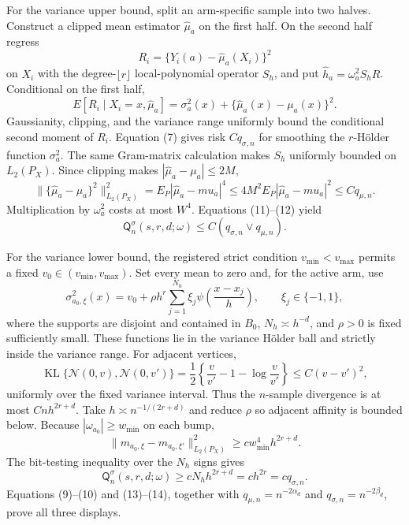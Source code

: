 For the variance upper bound, split an arm-specific sample into two halves.  Construct a clipped mean estimator \(\widehat\mu_a\) on the first half.  On the second half regress
\[
R_i=\{Y_i(a)-\widehat\mu_a(X_i)\}^2
\]
on \(X_i\) with the degree-\(\lfloor r\rfloor\) local-polynomial operator \(S_h\), and put \(\widehat h_a=\omega_a^2S_hR\).  Conditional on the first half,
\[
E[R_i\mid X_i=x,\widehat\mu_a]
=\sigma_a^2(x)+\{\widehat\mu_a(x)-\mu_a(x)\}^2.
\tag{11}
\]
Gaussianity, clipping, and the variance range uniformly bound the conditional second moment of \(R_i\).  Equation (7) gives risk \(Cq_{\sigma,n}\) for smoothing the \(r\)-Hölder function \(\sigma_a^2\).  The same Gram-matrix calculation makes \(S_h\) uniformly bounded on \(L_2(P_X)\).  Since clipping makes \(|\widehat\mu_a-\mu_a|\leq2M\),
\[
\|\{\widehat\mu_a-\mu_a\}^2\|_{L_2(P_X)}^2
=E_P|\widehat\mu_a-mu_a|^4
\leq4M^2E_P|\widehat\mu_a-mu_a|^2
\leq Cq_{\mu,n}.
\tag{12}
\]
Multiplication by \(\omega_a^2\) costs at most \(W^4\).  Equations (11)--(12) yield
\[
\mathsf Q_n^{\sigma}(s,r,d;\omega)
\leq C(q_{\sigma,n}\vee q_{\mu,n}).
\tag{13}
\]

For the variance lower bound, the registered strict condition \(v_{\min}<v_{\max}\) permits a fixed \(v_0\in(v_{\min},v_{\max})\).  Set every mean to zero and, for the active arm, use
\[
\sigma_{a_0,\xi}^2(x)=v_0+\rho h^r\sum_{j=1}^{N_h}\xi_j
\psi\!\left(\frac{x-x_j}{h}\right),
\qquad \xi_j\in\{-1,1\},
\]
where the supports are disjoint and contained in \(B_0\), \(N_h\asymp h^{-d}\), and \(\rho>0\) is fixed sufficiently small.  These functions lie in the variance Hölder ball and strictly inside the variance range.  For adjacent vertices,
\[
\operatorname{KL}\{\mathcal N(0,v),\mathcal N(0,v')\}
=\frac12\left\{\frac{v}{v'}-1-\log\frac{v}{v'}\right\}
\leq C(v-v')^2,
\]
uniformly over the fixed variance interval.  Thus the \(n\)-sample divergence is at most \(Cnh^{2r+d}\).  Take \(h\asymp n^{-1/(2r+d)}\) and reduce \(\rho\) so adjacent affinity is bounded below.  Because \(|\omega_{a_0}|\geq w_{\min}\) on each bump,
\[
\|m_{a_0,\xi}-m_{a_0,\xi'}\|_{L_2(P_X)}^2
\geq c w_{\min}^4h^{2r+d}.
\]
The bit-testing inequality over the \(N_h\) signs gives
\[
\mathsf Q_n^{\sigma}(s,r,d;\omega)
\geq cN_hh^{2r+d}=ch^{2r}=cq_{\sigma,n}.
\tag{14}
\]
Equations (9)--(10) and (13)--(14), together with \(q_{\mu,n}=n^{-2\alpha_d}\) and \(q_{\sigma,n}=n^{-2\beta_d}\), prove all three displays.